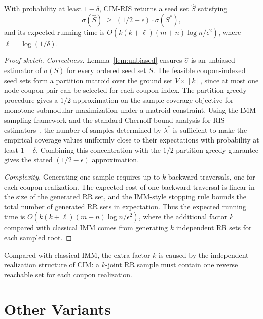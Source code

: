 \documentclass[sigconf]{acmart}
\newcommand{\CIMRIS}{\textsc{CIM-RIS}}
\begin{document}
\begin{theorem}
\label{thm:approx}
With probability at least $1-\delta$, \CIMRIS{} returns a seed set
$\hat{S}$ satisfying
\[
  \sigma(\hat{S}) \;\geq\; (1/2-\epsilon)\cdot\sigma(S^*),
\]
and its expected running time is
$O\!\left(k(k+\ell)(m+n)\log n/\epsilon^2\right)$, where
$\ell = \log(1/\delta)$.
\end{theorem}

\begin{proof}[Proof sketch]
\textit{Correctness.} Lemma~\ref{lem:unbiased} ensures $\hat{\sigma}$
is an unbiased estimator of $\sigma(S)$ for every ordered seed set $S$.
The feasible coupon-indexed seed sets form a partition matroid over the ground set
$V\times[k]$, since at most one node-coupon pair can be selected for
each coupon index.
The partition-greedy procedure gives a $1/2$ approximation on the
sample coverage objective for monotone submodular maximization under a
matroid constraint.
Using the IMM sampling framework and the standard Chernoff-bound
analysis for RIS estimators~\cite{tang2015influence}, the number of
samples determined by $\lambda^*$ is sufficient to make the empirical
coverage values uniformly close to their expectations with probability
at least $1-\delta$.
Combining this concentration with the $1/2$ partition-greedy guarantee
gives the stated $(1/2-\epsilon)$ approximation.

\textit{Complexity.}
Generating one sample requires up to $k$ backward traversals, one for
each coupon realization.
The expected cost of one backward traversal is linear in the size of
the generated RR set, and the IMM-style stopping rule bounds the total
number of generated RR sets in expectation.
Thus the expected running time is
$O(k(k+\ell)(m+n)\log n/\epsilon^2)$, where the additional factor $k$
compared with classical IMM comes from generating $k$ independent RR
sets for each sampled root.
\end{proof}

Compared with classical IMM, the extra factor $k$ is caused by the
independent-realization structure of CIM: a $k$-joint RR sample must
contain one reverse reachable set for each coupon realization.

\section{Other Variants}
\label{sec:variants}
\end{document}
